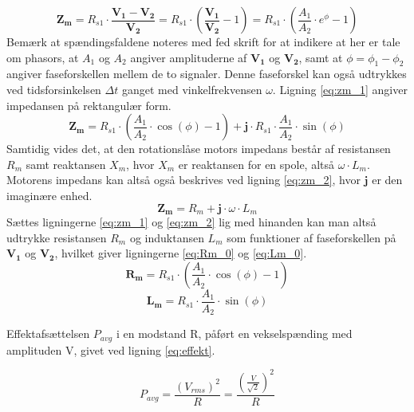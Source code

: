 \begin{equation}
	\mathbf{Z_m}=R_{s1}\cdot\frac{\mathbf{V_1}-\mathbf{V_2}}{\mathbf{V_2}}
			=R_{s1}\cdot\left(\frac{\mathbf{V_1}}{\mathbf{V_2}}-1\right)
			=R_{s1}\cdot\left(\frac{A_1}{A_2}\cdot{e}^{\phi}-1\right)
	\label{eq:zm_0} 
 \end{equation}
Bemærk at spændingsfaldene noteres med fed skrift for at indikere at her er tale om phasors,
at \(A_1\) og \(A_2\) angiver amplituderne af \(\mathbf{V_1}\) og \(\mathbf{V_2}\),
samt at \(\phi=\phi_1-\phi_2\) angiver faseforskellen mellem de to signaler.
Denne faseforskel kan også udtrykkes ved tidsforsinkelsen \(\Delta{t}\) ganget med vinkelfrekvensen \(\omega\).
Ligning \ref{eq:zm_1} angiver impedansen på rektangulær form.
\begin{equation}
	\mathbf{Z_m}=R_{s1}\cdot\left(\frac{A_1}{A_2}\cdot{\cos (\phi)}-1\right)	%
	+\mathbf{j}\cdot{R_{s1}}\cdot\frac{A_1}{A_2}\cdot\sin(\phi)	%
	\label{eq:zm_1} 
 \end{equation}
Samtidig vides det, at den rotationslåse motors impedans består af resistansen \(R_m\) samt
reaktansen \(X_m\), hvor \(X_m\) er reaktansen for en spole, altså \(\omega\cdot{L_m}\).
Motorens impedans kan altså også beskrives ved ligning \ref{eq:zm_2}, hvor \(\mathbf{j}\) er den imaginære enhed.
\begin{equation}
	\mathbf{Z_m}=R_m+\mathbf{j}\cdot\omega\cdot{L_m}
	\label{eq:zm_2} 
 \end{equation}
Sættes ligningerne \ref{eq:zm_1} og \ref{eq:zm_2} lig med hinanden
kan man altså udtrykke resistansen \(R_m\) og induktansen \(L_m\) som funktioner
af faseforskellen på \(\mathbf{V_1}\) og \(\mathbf{V_2}\),
hvilket giver ligningerne \ref{eq:Rm_0} og \ref{eq:Lm_0}.
\begin{equation}
	\mathbf{R_m}=R_{s1}\cdot\left(\frac{A_1}{A_2}\cdot{\cos (\phi)}-1\right)
	\label{eq:Rm_0} 
 \end{equation}
\begin{equation}
	\mathbf{L_m}=R_{s1}\cdot\frac{A_1}{A_2}\cdot\sin(\phi)
	\label{eq:Lm_0} 
 \end{equation}

Effektafsættelsen \(P_{avg}\) i en modstand R, påført en vekselspænding med amplituden V, givet ved ligning \ref{eq:effekt}.

\begin{equation}
	P_{avg}=\frac{\left(V_{rms}\right)^2}{R}=\frac{\left(\frac{V}{\sqrt{2}}\right)^2}{R}
	\label{eq:effekt}
 \end{equation}

